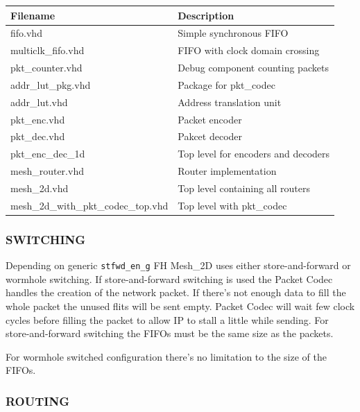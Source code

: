 \documentclass[a4paper,10pt,oneside,final]{article}
\def\deftablecolora{blue!10!white}
\def\deftablecolorb{white}
\begin{document}
\begin{center}
  \rowcolors{3}{\deftablecolora}{\deftablecolorb}

  \label{tab:files}
  \begin{tabularx}{\textwidth}{|lX|}
    \hline
    Filename   & Description\\
    \hline
    fifo.vhd           & Simple synchronous FIFO\\
    multiclk\_fifo.vhd & FIFO with clock domain crossing\\
    pkt\_counter.vhd   & Debug component counting packets\\   
    addr\_lut\_pkg.vhd & Package for pkt\_codec\\
    addr\_lut.vhd      & Address translation unit\\
    pkt\_enc.vhd       & Packet encoder\\
    pkt\_dec.vhd       & Pakcet decoder\\
    pkt\_enc\_dec\_1d  & Top level for encoders and decoders\\    
    mesh\_router.vhd   & Router implementation\\
    mesh\_2d.vhd       & Top level containing all routers\\
    mesh\_2d\_with\_pkt\_codec\_top.vhd & Top level with pkt\_codec\\
    \hline
  \end{tabularx}  
\end{center}


\subsubsection{SWITCHING}

Depending on generic \texttt{stfwd\_en\_g} FH Mesh\_2D uses either
store-and-forward or wormhole switching. If store-and-forward
switching is used the Packet Codec handles the creation of the
network packet. If there's not enough data to fill the whole packet
the unused flits will be sent empty. Packet Codec will wait few clock
cycles before filling the packet to allow IP to stall a little while
sending. For store-and-forward switching the FIFOs must be the same
size as the packets. 

\vspace{0.4cm}
\noindent
For wormhole switched configuration there's no limitation to the size
of the FIFOs.


\subsubsection{ROUTING}
\end{document}
